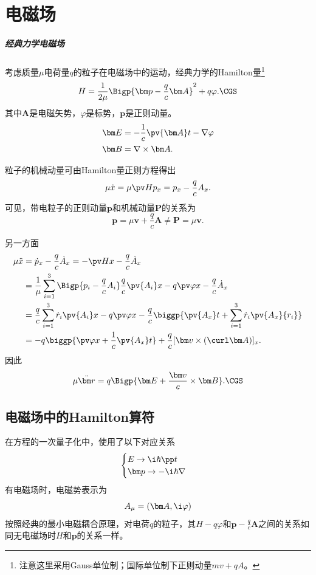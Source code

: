 \chapter{电磁场}
\paragraph{经典力学电磁场}考虑质量$\mu$电荷量$q$的粒子在电磁场中的运动，经典力学的Hamilton量\footnote{注意这里采用Gauss单位制；国际单位制下正则动量$mv+qA$。}
\[
	H=\frac1{2\mu}\Bigp{\bm p-\frac qc\bm A}^2+q\varphi.\CGS
\]
其中$\bm A$是电磁矢势，$\varphi$是标势，$\bm p$是正则动量。
\begin{align*}
	\bm E & =-\frac1c\pv{\bm A}t-\nabla\varphi \\
	\bm B & =\nabla\times\bm A.
\end{align*}

粒子的机械动量可由Hamilton量正则方程得出
\[
	\mu\dot x=\mu\pv H{p_x}=p_x-\frac qcA_x.
\]
可见，带电粒子的正则动量$\bm p$和机械动量$\bm P$的关系为
\[
	\bm p=\mu\bm v+\frac qc\bm A\neq\bm P=\mu\bm v.
\]

另一方面
\begin{align*}
	\mu\ddot x & =\dot p_x-\frac qc\dot A_x=-\pv Hx-\frac qc\dot A_x                                                        \\
	           & =\frac1\mu\sum_{i=1}^3\Bigp{p_i-\frac qcA_i}\frac qc\pv{A_i}x-q\pv\varphi{x}-\frac qc\dot A_x                    \\
	           & =\frac qc\sum_{i=1}^3\dot r_i\pv{A_i}x-q\pv\varphi{x}-\frac qc\biggp{\pv{A_x}t+\sum_{i=1}^3\dot r_i\pv{A_x}{r_i}} \\
	           & =-q\biggp{\pv\varphi{x}+\frac1c\pv{A_x}t}+\frac qc[\bm v\times(\curl\bm A)]_x.
\end{align*}
因此
\[
	\mu\ddot{\bm r}=q\Bigp{\bm E+\frac{\bm v}c\times\bm B}.\CGS
\]
\section{电磁场中的Hamilton算符}
在\Schr 方程的一次量子化中，使用了以下对应关系
\begin{align}
	\begin{cases}
		E\to\i\hbar\pp t \\
		\bm p\to-\i\hbar\nabla
	\end{cases}
\end{align}
有电磁场时，电磁势表示为
\[
	A_\mu=(\bm A,\i\varphi)
\]
按照经典的最小电磁耦合原理，对电荷$q$的粒子，其$H-q\varphi$和$\bm p-\frac qc\bm A$之间的关系如同无电磁场时$H$和$\bm p$的关系一样。


